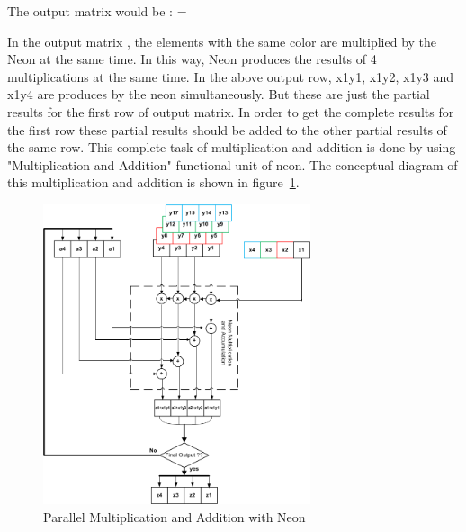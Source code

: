 The output matrix would be : 
=
\begin{table}[h]
\end{table}

In the output matrix ,  the  elements with the same color are multiplied by the Neon at the same time. In this way, Neon produces the results of 4 multiplications at the same time.  In the above output row, x1y1, x1y2, x1y3 and x1y4 are produces by the neon simultaneously.  But these are just the partial results for the first row of output matrix. In order to get the complete results for the first row these partial results should be added to the other partial results  of the same row.  This complete task of multiplication and addition is done by using "Multiplication and Addition" functional unit of neon. The conceptual diagram of this multiplication and addition is shown in figure~\ref{fig:neon_mult_add}.
\begin{figure}[h]
\centering 
\includegraphics[width= 0.7\textwidth]{images/MandA}
\caption{Parallel Multiplication and Addition with Neon  }
\label{fig:neon_mult_add}
\end{figure}
